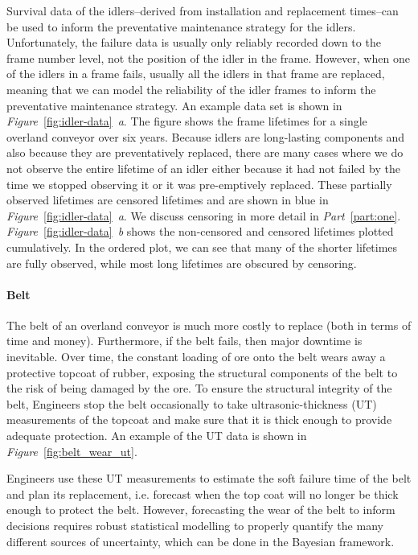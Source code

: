 Survival data of the idlers--derived from installation and replacement times--can be used to inform the preventative maintenance strategy for the idlers. Unfortunately, the failure data is usually only reliably recorded down to the frame number level, not the position of the idler in the frame. However, when one of the idlers in a frame fails, usually all the idlers in that frame are replaced, meaning that we can model the reliability of the idler frames to inform the preventative maintenance strategy. An example data set is shown in \textit{Figure}~\ref{fig:idler-data}~\textit{a}. The figure shows the frame lifetimes for a single overland conveyor over six years. Because idlers are long-lasting components and also because they are preventatively replaced, there are many cases where we do not observe the entire lifetime of an idler either because it had not failed by the time we stopped observing it or it was pre-emptively replaced. These partially observed lifetimes are censored lifetimes and are shown in blue in \textit{Figure}~\ref{fig:idler-data}~\textit{a}. We discuss censoring in more detail in \textit{Part}~\ref{part:one}. \textit{Figure}~\ref{fig:idler-data}~\textit{b} shows the non-censored and censored lifetimes plotted cumulatively. In the ordered plot, we can see that many of the shorter lifetimes are fully observed, while most long lifetimes are obscured by censoring.

\paragraph*{Belt}

The belt of an overland conveyor is much more costly to replace (both in terms of time and money). Furthermore, if the belt fails, then major downtime is inevitable. Over time, the constant loading of ore onto the belt wears away a protective topcoat of rubber, exposing the structural components of the belt to the risk of being damaged by the ore. To ensure the structural integrity of the belt, Engineers stop the belt occasionally to take ultrasonic-thickness (UT) measurements of the topcoat and make sure that it is thick enough to provide adequate protection. An example of the UT data is shown in \textit{Figure}~\ref{fig:belt_wear_ut}.

Engineers use these UT measurements to estimate the soft failure time of the belt and plan its replacement, i.e. forecast when the top coat will no longer be thick enough to protect the belt. However, forecasting the wear of the belt to inform decisions requires robust statistical modelling to properly quantify the many different sources of uncertainty, which can be done in the Bayesian framework.

